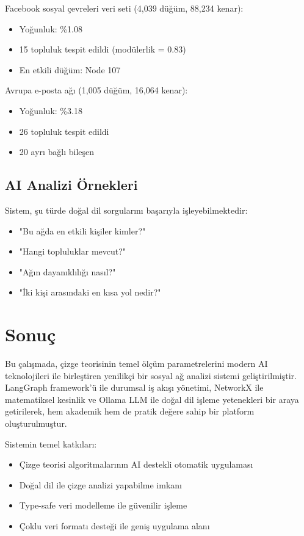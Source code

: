 \documentclass[conference]{IEEEtran}
\begin{document}
Facebook sosyal çevreleri veri seti (4,039 düğüm, 88,234 kenar):
\begin{itemize}
\item Yoğunluk: \%1.08
\item 15 topluluk tespit edildi (modülerlik = 0.83)
\item En etkili düğüm: Node 107
\end{itemize}

Avrupa e-posta ağı (1,005 düğüm, 16,064 kenar):
\begin{itemize}
\item Yoğunluk: \%3.18
\item 26 topluluk tespit edildi
\item 20 ayrı bağlı bileşen
\end{itemize}

\subsection{AI Analizi Örnekleri}

Sistem, şu türde doğal dil sorgularını başarıyla işleyebilmektedir:

\begin{itemize}
\item "Bu ağda en etkili kişiler kimler?"
\item "Hangi topluluklar mevcut?"
\item "Ağın dayanıklılığı nasıl?"
\item "İki kişi arasındaki en kısa yol nedir?"
\end{itemize}

\section{Sonuç}

Bu çalışmada, çizge teorisinin temel ölçüm parametrelerini modern AI teknolojileri ile birleştiren yenilikçi bir sosyal ağ analizi sistemi geliştirilmiştir. LangGraph framework'ü ile durumsal iş akışı yönetimi, NetworkX ile matematiksel kesinlik ve Ollama LLM ile doğal dil işleme yetenekleri bir araya getirilerek, hem akademik hem de pratik değere sahip bir platform oluşturulmuştur.

Sistemin temel katkıları:
\begin{itemize}
\item Çizge teorisi algoritmalarının AI destekli otomatik uygulaması
\item Doğal dil ile çizge analizi yapabilme imkanı
\item Type-safe veri modelleme ile güvenilir işleme
\item Çoklu veri formatı desteği ile geniş uygulama alanı
\end{itemize}
\end{document}
